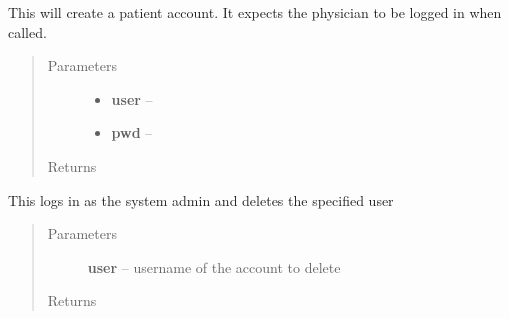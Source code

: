 \documentclass[letterpaper,10pt,english]{sphinxmanual}
\begin{document}
\begin{fulllineitems}
\begin{fulllineitems}
\label{STD/WebUI:WebUI.WebUI.WebUI.create_patient}
This will create a patient account. It expects the physician to be logged in when called.
\begin{quote}\begin{description}
\item[{Parameters}] \leavevmode\begin{itemize}
\item {} 
\textbf{user} -- 

\item {} 
\textbf{pwd} -- 

\end{itemize}

\item[{Returns}] \leavevmode


\end{description}\end{quote}

\end{fulllineitems}


\begin{fulllineitems}
\label{STD/WebUI:WebUI.WebUI.WebUI.delete_account}
This logs in as the system admin and deletes the specified user
\begin{quote}\begin{description}
\item[{Parameters}] \leavevmode
\textbf{user} -- username of the account to delete

\item[{Returns}] \leavevmode


\end{description}\end{quote}

\end{fulllineitems}


\begin{fulllineitems}
\label{STD/WebUI:WebUI.WebUI.WebUI.delete_all_accounts}
\end{fulllineitems}


\end{fulllineitems}
\end{document}
